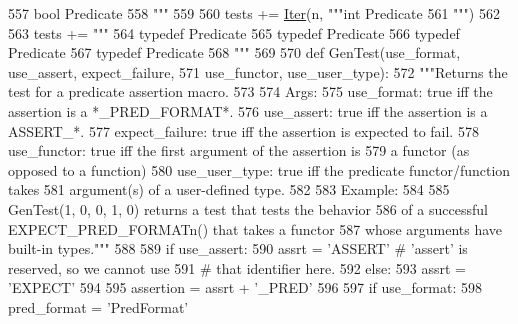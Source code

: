 \begin{DoxyCode}
{{{{{{{{{{{{{{{{{{{{{{{{{{{{{{{{{{{{{{{{{{{557 \textcolor{stringliteral}{bool Predicate%
558 \textcolor{stringliteral}{"""} %
559 
560   tests += \hyperlink{namespacegen__gtest__pred__impl_ac016218b7c9437d1d5ac85c574c83069}{Iter}(n, \textcolor{stringliteral}{"""int Predicate%
561 \textcolor{stringliteral}{"""}) %
562 
563   tests += \textcolor{stringliteral}{"""}
564 \textcolor{stringliteral}{typedef Predicate%
565 \textcolor{stringliteral}{typedef Predicate%
566 \textcolor{stringliteral}{typedef Predicate%
567 \textcolor{stringliteral}{typedef Predicate%
568 \textcolor{stringliteral}{"""} %
569 
570   \textcolor{keyword}{def }GenTest(use\_format, use\_assert, expect\_failure,
571               use\_functor, use\_user\_type):
572     \textcolor{stringliteral}{"""Returns the test for a predicate assertion macro.}
573 \textcolor{stringliteral}{}
574 \textcolor{stringliteral}{    Args:}
575 \textcolor{stringliteral}{      use\_format:     true iff the assertion is a *\_PRED\_FORMAT*.}
576 \textcolor{stringliteral}{      use\_assert:     true iff the assertion is a ASSERT\_*.}
577 \textcolor{stringliteral}{      expect\_failure: true iff the assertion is expected to fail.}
578 \textcolor{stringliteral}{      use\_functor:    true iff the first argument of the assertion is}
579 \textcolor{stringliteral}{                      a functor (as opposed to a function)}
580 \textcolor{stringliteral}{      use\_user\_type:  true iff the predicate functor/function takes}
581 \textcolor{stringliteral}{                      argument(s) of a user-defined type.}
582 \textcolor{stringliteral}{}
583 \textcolor{stringliteral}{    Example:}
584 \textcolor{stringliteral}{}
585 \textcolor{stringliteral}{      GenTest(1, 0, 0, 1, 0) returns a test that tests the behavior}
586 \textcolor{stringliteral}{      of a successful EXPECT\_PRED\_FORMATn() that takes a functor}
587 \textcolor{stringliteral}{      whose arguments have built-in types."""}
588 
589     \textcolor{keywordflow}{if} use\_assert:
590       assrt = \textcolor{stringliteral}{'ASSERT'}  \textcolor{comment}{# 'assert' is reserved, so we cannot use}
591                         \textcolor{comment}{# that identifier here.}
592     \textcolor{keywordflow}{else}:
593       assrt = \textcolor{stringliteral}{'EXPECT'}
594 
595     assertion = assrt + \textcolor{stringliteral}{'\_PRED'}
596 
597     \textcolor{keywordflow}{if} use\_format:
598       pred\_format = \textcolor{stringliteral}{'PredFormat'}
}}}}}}}}}}}}}}}}}}}}}}}}}}}}}}}}}}}}}}}}}}}}}}}}}
\end{DoxyCode}
